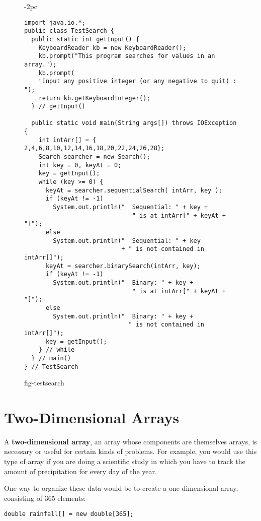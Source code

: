 \begin{figure}[thb]
\jjjprogstart
\begin{jjjlistingleft}[28pc]{-2pc}
\begin{lstlisting}
import java.io.*;
public class TestSearch {
  public static int getInput() {
    KeyboardReader kb = new KeyboardReader();
    kb.prompt("This program searches for values in an array.");
    kb.prompt(
    "Input any positive integer (or any negative to quit) : ");
    return kb.getKeyboardInteger();
  } // getInput()

  public static void main(String args[]) throws IOException {
    int intArr[] = { 2,4,6,8,10,12,14,16,18,20,22,24,26,28};
    Search searcher = new Search();
    int key = 0, keyAt = 0;
    key = getInput();
    while (key >= 0) {
      keyAt = searcher.sequentialSearch( intArr, key );
      if (keyAt != -1)
        System.out.println("  Sequential: " + key + 
                              " is at intArr[" + keyAt + "]");
      else
        System.out.println("  Sequential: " + key 
                           + " is not contained in intArr[]");
      keyAt = searcher.binarySearch(intArr, key);
      if (keyAt != -1)
        System.out.println("  Binary: " + key + 
                              " is at intArr[" + keyAt + "]");
      else
        System.out.println("  Binary: " + key + 
                             " is not contained in intArr[]");
      key = getInput();
    } // while
  } // main()
} // TestSearch
\end{lstlisting}
\end{jjjlistingleft}
{fig-testsearch}
\end{figure}


\section{Two-Dimensional Arrays}
\label{two-dimensional-arrays}
\noindent A {\bf two-dimensional array}, an array whose components are
themselves arrays, is necessary or useful for certain kinds of
problems.  For example, you would use this type of array if you are
doing a scientific study in which you have to track the amount of
precipitation for every day of the year.

One way to organize these data would be to create a one-dimensional
array, consisting of 365 elements:

\begin{jjjlisting}
\begin{lstlisting}
double rainfall[] = new double[365];
\end{lstlisting}
\end{jjjlisting}

